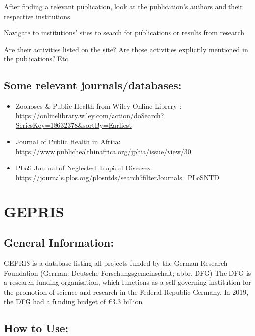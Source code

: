 \documentclass[
]{book}
\begin{document}
After finding a relevant publication, look at the publication's authors and their respective institutions

Navigate to institutions' sites to search for publications or results from research

Are their activities listed on the site? Are those activities explicitly mentioned in the publications? Etc.

\hypertarget{some-relevant-journalsdatabases}{%
\subsection{Some relevant journals/databases:}\label{some-relevant-journalsdatabases}}

\begin{itemize}
\item
  Zoonoses \& Public Health from Wiley Online Library : \url{https://onlinelibrary.wiley.com/action/doSearch?SeriesKey=18632378\&sortBy=Earliest}
\item
  Journal of Public Health in Africa: \url{https://www.publichealthinafrica.org/jphia/issue/view/30}
\item
  PLoS Journal of Neglected Tropical Diseases: \url{https://journals.plos.org/plosntds/search?filterJournals=PLoSNTD}
\end{itemize}

\hypertarget{update-gepris}{%
\section{GEPRIS}\label{update-gepris}}

\hypertarget{general-information-1}{%
\subsection{General Information:}\label{general-information-1}}

GEPRIS is a database listing all projects funded by the German Research Foundation (German: Deutsche Forschungsgemeinschaft; abbr. DFG) The DFG is a research funding organisation, which functions as a self-governing institution for the promotion of science and research in the Federal Republic Germany. In 2019, the DFG had a funding budget of €3.3 billion.

\hypertarget{how-to-use}{%
\subsection{How to Use:}\label{how-to-use}}
\end{document}

